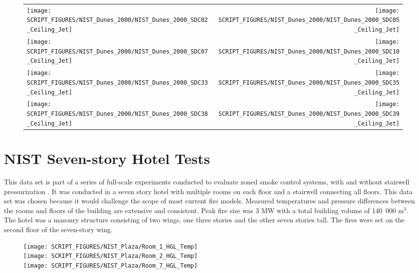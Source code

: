 \begin{figure}[h!]
\begin{tabular*}{\textwidth}{l@{\extracolsep{\fill}}r}
\texttt{[image: SCRIPT\_FIGURES/NIST\_Dunes\_2000/NIST\_Dunes\_2000\_SDC02\_Ceiling\_Jet]} &
\texttt{[image: SCRIPT\_FIGURES/NIST\_Dunes\_2000/NIST\_Dunes\_2000\_SDC05\_Ceiling\_Jet]} \\
\texttt{[image: SCRIPT\_FIGURES/NIST\_Dunes\_2000/NIST\_Dunes\_2000\_SDC07\_Ceiling\_Jet]} &
\texttt{[image: SCRIPT\_FIGURES/NIST\_Dunes\_2000/NIST\_Dunes\_2000\_SDC10\_Ceiling\_Jet]} \\
\texttt{[image: SCRIPT\_FIGURES/NIST\_Dunes\_2000/NIST\_Dunes\_2000\_SDC33\_Ceiling\_Jet]} &
\texttt{[image: SCRIPT\_FIGURES/NIST\_Dunes\_2000/NIST\_Dunes\_2000\_SDC35\_Ceiling\_Jet]} \\
\texttt{[image: SCRIPT\_FIGURES/NIST\_Dunes\_2000/NIST\_Dunes\_2000\_SDC38\_Ceiling\_Jet]} &
\texttt{[image: SCRIPT\_FIGURES/NIST\_Dunes\_2000/NIST\_Dunes\_2000\_SDC39\_Ceiling\_Jet]}
\end{tabular*}
\label{NIST_Dunes_2000_Ceiling_Jet}
\end{figure}

\clearpage

\section{NIST Seven-story Hotel Tests}

This data set is part of  a series of full-scale experiments conducted to evaluate zoned smoke control systems, with and without stairwell pressurization \cite{Klote:1990}.  It was conducted in a seven story hotel with multiple rooms on each floor and a stairwell connecting all floors.  This data set was chosen because it would challenge the scope of most current fire models.  Measured temperatures and pressure differences between the rooms and floors of the building are extensive and consistent.  Peak fire size was 3 MW with a total building volume of 140~000 m$^3$. The hotel was a masonry structure consisting of two wings, one three stories and the other seven stories tall. The fires were set on the second floor of the seven-story wing.

\begin{figure}
\begin{center}
\texttt{[image: SCRIPT\_FIGURES/NIST\_Plaza/Room\_1\_HGL\_Temp]} \\
\texttt{[image: SCRIPT\_FIGURES/NIST\_Plaza/Room\_2\_HGL\_Temp]} \\
\texttt{[image: SCRIPT\_FIGURES/NIST\_Plaza/Room\_7\_HGL\_Temp]}
\end{center}
\end{figure}


